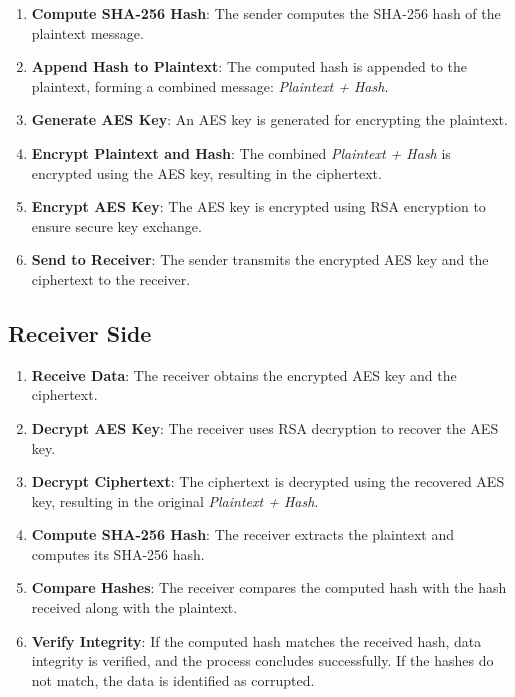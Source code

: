 \documentclass{article}
\begin{document}
\begin{enumerate}
    \item \textbf{Compute SHA-256 Hash}: 
    The sender computes the SHA-256 hash of the plaintext message.

    \item \textbf{Append Hash to Plaintext}:
    The computed hash is appended to the plaintext, forming a combined message: \textit{Plaintext + Hash}.

    \item \textbf{Generate AES Key}:
    An AES key is generated for encrypting the plaintext.

    \item \textbf{Encrypt Plaintext and Hash}:
    The combined \textit{Plaintext + Hash} is encrypted using the AES key, resulting in the ciphertext.

    \item \textbf{Encrypt AES Key}:
    The AES key is encrypted using RSA encryption to ensure secure key exchange.

    \item \textbf{Send to Receiver}:
    The sender transmits the encrypted AES key and the ciphertext to the receiver.
\end{enumerate}

\subsection*{Receiver Side}

\begin{enumerate}
    \item \textbf{Receive Data}:
    The receiver obtains the encrypted AES key and the ciphertext.

    \item \textbf{Decrypt AES Key}:
    The receiver uses RSA decryption to recover the AES key.

    \item \textbf{Decrypt Ciphertext}:
    The ciphertext is decrypted using the recovered AES key, resulting in the original \textit{Plaintext + Hash}.

    \item \textbf{Compute SHA-256 Hash}:
    The receiver extracts the plaintext and computes its SHA-256 hash.

    \item \textbf{Compare Hashes}:
    The receiver compares the computed hash with the hash received along with the plaintext.

    \item \textbf{Verify Integrity}:
    If the computed hash matches the received hash, data integrity is verified, and the process concludes successfully.
    If the hashes do not match, the data is identified as corrupted.
\end{enumerate}
\end{document}
